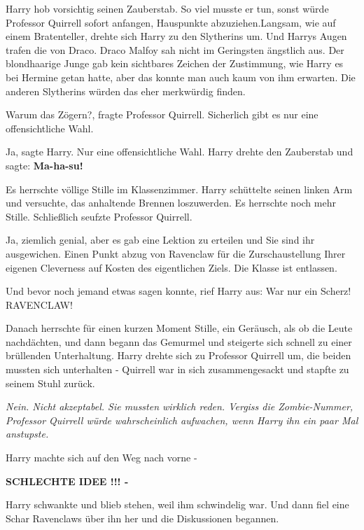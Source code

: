 Harry hob vorsichtig seinen Zauberstab. So viel musste er tun, sonst würde
Professor Quirrell sofort anfangen, Hauspunkte abzuziehen.Langsam, wie auf einem
Bratenteller, drehte sich Harry zu den Slytherins um. Und Harrys Augen trafen
die von Draco. Draco Malfoy sah nicht im Geringsten ängstlich aus. Der
blondhaarige Junge gab kein sichtbares Zeichen der Zustimmung, wie Harry es bei
Hermine getan hatte, aber das konnte man auch kaum von ihm erwarten. Die anderen
Slytherins würden das eher merkwürdig finden.

\glqq Warum das Zögern?\grqq{}, fragte Professor Quirrell. \glqq Sicherlich
gibt es nur eine offensichtliche Wahl.\grqq{}

\glqq Ja\grqq{}, sagte Harry. \glqq Nur eine offensichtliche Wahl.\grqq{} Harry
drehte den Zauberstab und sagte: \textbf{\glqq Ma-ha-su!\grqq{} }

Es herrschte völlige Stille im Klassenzimmer. Harry schüttelte seinen linken Arm
und versuchte, das anhaltende Brennen loszuwerden. Es herrschte noch mehr
Stille. Schließlich seufzte Professor Quirrell.

\glqq Ja, ziemlich genial, aber es gab eine Lektion zu erteilen und Sie sind ihr
ausgewichen. Einen Punkt abzug von Ravenclaw für die Zurschaustellung Ihrer
eigenen Cleverness auf Kosten des eigentlichen Ziels. Die Klasse ist
entlassen.\grqq{}

Und bevor noch jemand etwas sagen konnte, rief Harry aus: \glqq War nur ein
Scherz! RAVENCLAW!\grqq{}

Danach herrschte für einen kurzen Moment Stille, ein Geräusch, als ob die Leute
nachdächten, und dann begann das Gemurmel und steigerte sich schnell zu einer
brüllenden Unterhaltung. Harry drehte sich zu Professor Quirrell um, die beiden
mussten sich unterhalten - Quirrell war in sich zusammengesackt und stapfte zu
seinem Stuhl zurück.

\emph{Nein. Nicht akzeptabel. Sie mussten wirklich reden. Vergiss die
Zombie-Nummer, Professor Quirrell würde wahrscheinlich aufwachen, wenn Harry ihn
ein paar Mal anstupste. }

Harry machte sich auf den Weg nach vorne -

\textbf{SCHLECHTE IDEE !!! -}

Harry schwankte und blieb stehen, weil ihm schwindelig war. Und dann fiel eine
Schar Ravenclaws über ihn her und die Diskussionen begannen.